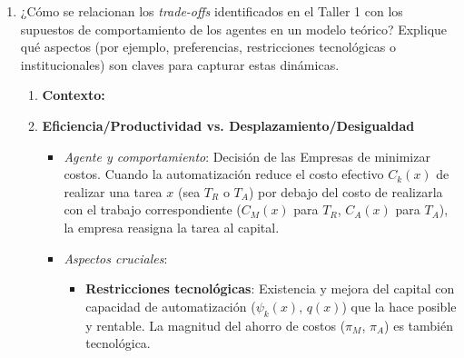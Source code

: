 \documentclass{article}
\theoremstyle{remark}
\theoremstyle{definition}
\begin{document}
\begin{enumerate}
\begin{tcolorbox}[title= Solución Punto 1 (Revisado - Versión Preferida)]
\end{tcolorbox}
    
    \item ¿Cómo se relacionan los \emph{trade-offs} identificados en el Taller 1 con los supuestos de comportamiento de los agentes en un modelo teórico? Explique qué aspectos (por ejemplo, preferencias, restricciones tecnológicas o institucionales) son claves para capturar estas dinámicas.

        \begin{tcolorbox}[title= Soluci\'on 2]
            \begin{enumerate}

                \item \textbf{Contexto: } 

            \item \textbf{Eficiencia/Productividad vs. Desplazamiento/Desigualdad}
              \begin{itemize}
                \item \emph{Agente y comportamiento}: Decisi\'on de las Empresas de minimizar costos. Cuando la automatizaci\'on reduce el costo efectivo $C_k(x)$ de realizar una tarea $x$ (sea $T_R$ o $T_A$) por debajo del costo de realizarla con el trabajo correspondiente ($C_M(x)$ para $T_R$, $C_A(x)$ para $T_A$), la empresa reasigna la tarea al capital.
                \item \emph{Aspectos cruciales}:
                  \begin{itemize}
                    \item \textbf{Restricciones tecnol\'ogicas}: Existencia y mejora del capital con capacidad de automatizaci\'on ($\psi_k(x)$, $q(x)$) que la hace posible y rentable. La magnitud del ahorro de costos ($\pi_M$, $\pi_A$) es tambi\'en tecnol\'ogica.

\end{itemize}
\end{itemize}
\end{enumerate}
\end{tcolorbox}
\end{enumerate}
\end{document}
